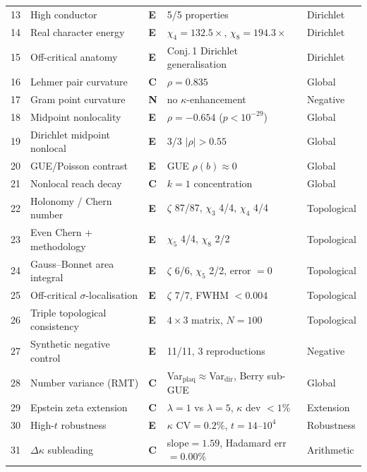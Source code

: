 \documentclass[11pt, a4paper]{article}
\theoremstyle{definition}
\theoremstyle{plain}
\begin{document}
\begin{center}
\begin{longtable}{@{}r l l p{4.2cm} l@{}}
13 & High conductor             & \textbf{E} & 5/5 properties                   & Dirichlet \\
14 & Real character energy      & \textbf{E} & $\chi_4{=}132.5\times$, $\chi_8{=}194.3\times$ & Dirichlet \\
15 & Off-critical anatomy       & \textbf{E} & Conj.\,1 Dirichlet generalisation & Dirichlet \\
\midrule
16 & Lehmer pair curvature      & \textbf{C} & $\rho=0.835$                      & Global \\
17 & Gram point curvature       & \textbf{N} & no $\kappa$-enhancement           & Negative \\
18 & Midpoint nonlocality       & \textbf{E} & $\rho={-0.654}$ ($p<10^{-29}$)   & Global \\
19 & Dirichlet midpoint nonlocal & \textbf{E} & 3/3 $|\rho|>0.55$               & Global \\
20 & GUE/Poisson contrast       & \textbf{E} & GUE $\rho(b)\approx 0$           & Global \\
21 & Nonlocal reach decay       & \textbf{C} & $k=1$ concentration               & Global \\
\midrule
22 & Holonomy / Chern number    & \textbf{E} & $\zeta$ 87/87, $\chi_3$ 4/4, $\chi_4$ 4/4 & Topological \\
23 & Even Chern + methodology   & \textbf{E} & $\chi_5$ 4/4, $\chi_8$ 2/2       & Topological \\
24 & Gauss--Bonnet area integral & \textbf{E} & $\zeta$ 6/6, $\chi_5$ 2/2, error $=0$ & Topological \\
25 & Off-critical $\sigma$-localisation & \textbf{E} & $\zeta$ 7/7, FWHM $<0.004$ & Topological \\
26 & Triple topological consistency & \textbf{E} & $4{\times}3$ matrix, $N=100$  & Topological \\
\midrule
27 & Synthetic negative control & \textbf{E} & 11/11, 3 reproductions           & Negative \\
28 & Number variance (RMT)      & \textbf{C} & Var$_\text{plaq}{\approx}$Var$_\text{dir}$, Berry sub-GUE & Global \\
\midrule
29 & Epstein zeta extension     & \textbf{C} & $\lambda{=}1$ vs $\lambda{=}5$, $\kappa$ dev ${<}1\%$   & Extension \\
\midrule
30 & High-$t$ robustness        & \textbf{E} & $\kappa$ CV${=}0.2\%$, $t{=}14$--$10^4$ & Robustness \\
\midrule
31 & $\Delta\kappa$ subleading   & \textbf{C} & slope${=}1.59$, Hadamard err${=}0.00\%$ & Arithmetic \\

\end{longtable}
\end{center}
\end{document}

